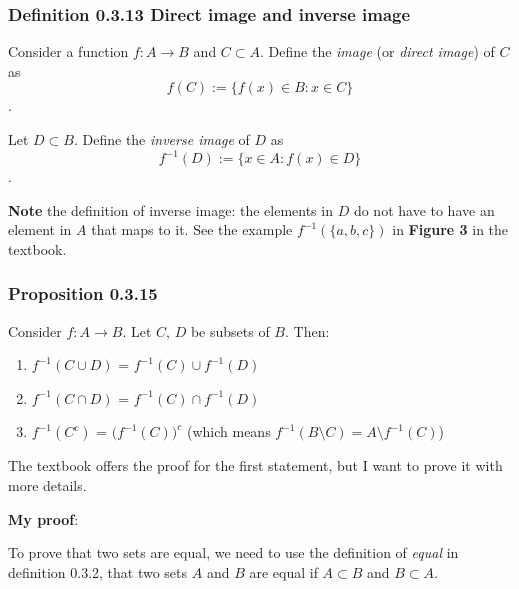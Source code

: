 \documentclass[12pt, letterpaper, oneside]{book}
\begin{document}
\subsubsection{Definition 0.3.13 Direct image and inverse image}

Consider a function $f: A \rightarrow B$ and $C \subset A$. Define the
\textit{image} (or \textit{direct image}) of $C$ as \[ f(C) := \{f(x) \in B:
x \in C\} \].

Let $D \subset B$. Define the \textit{inverse image} of $D$ as \[ f^{-1}(D) :=
\{x \in A: f(x) \in D\}\].

\textbf{Note} the definition of inverse image: the elements in $D$ do not have
to have an element in $A$ that maps to it. See the example $f^{-1}(\{a,b,c\})$
in \textbf{Figure 3} in the textbook.

\subsubsection{Proposition 0.3.15}

Consider $f: A \rightarrow B$. Let $C$, $D$ be subsets of $B$. Then:
\begin{enumerate}
  \item $f^{-1}(C \cup D)$ = $f^{-1}(C) \cup f^{-1}(D)$
  \item $f^{-1}(C \cap D)$ = $f^{-1}(C) \cap f^{-1}(D)$
  \item $f^{-1}(C^c)$ = $\bigl(f^{-1}(C)\bigr)^c$ (which means $f^{-1}(B
    \setminus C) = A \setminus f^{-1}(C)$)
\end{enumerate}

The textbook offers the proof for the first statement, but I want to prove it
with more details.

\textbf{My proof}:

To prove that two sets are equal, we need to use the definition of \textit{
equal} in definition 0.3.2, that two sets $A$ and $B$ are equal if $A \subset B$
and $B \subset A$.
\end{document}

